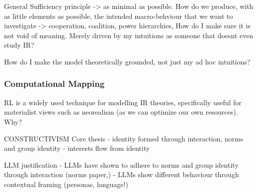 General Sufficiency principle -> as minimal as possible.
How do we produce, with as little elements as possible, the intended macro-behviour that we want to investigate -> cooperation, coalition, power hierarchies,
How do I make sure it is not void of meaning. Merely driven by my intuitions as someone that doesnt even study IR?

How do I make the model theoretically grounded, not just my ad hoc intuitions?


\subsubsection{Computational Mapping}
%

RL is a widely used technique for modelling IR theories, specifically useful for materialist views such as neorealism (as we can optimize our own resources).
Why?


CONSTRUCTIVISM
Core thesis
- identity formed through interaction, norms and group identity
- interests flow from identity

LLM justification
- LLMs have shown to adhere to norms and group identity through interaction (norms paper,)
- LLMs show different behaviour through contextual framing (personas, language!)

